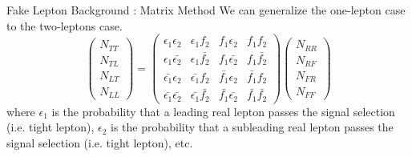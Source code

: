 \documentclass[mathserif,serif]{beamer}
\begin{document}
\begin{frame}{Fake Lepton Background : Matrix Method}
We can generalize the one-lepton case to the two-leptons case.
\begin{equation*}
\left( \begin{array}{c}
N_{TT} \\
N_{TL} \\
N_{LT} \\
N_{LL}
\end{array} \right)
=
\left( \begin{array}{cccc}
\epsilon_1 \epsilon_2 & \epsilon_1 f_2 & f_1 \epsilon_2 & f_1 f_2 \\
\epsilon_1 \bar{\epsilon_2} & \epsilon_1 \bar{f_2} & f_1 \bar{\epsilon_2} & f_1 \bar{f_2} \\
\bar{\epsilon_1} \epsilon_2 & \bar{\epsilon_1} f_2 & \bar{f_1} \epsilon_2 & \bar{f_1} f_2 \\
\bar{\epsilon_1} \bar{\epsilon_2} & \bar{\epsilon_1} \bar{f_2} & \bar{f_1} \bar{\epsilon_2} & \bar{f_1} \bar{f_2}
\end{array} \right)
\left( \begin{array}{c}
N_{RR} \\
N_{RF} \\
N_{FR} \\
N_{FF}
\end{array} \right)
\end{equation*}
where $\epsilon_1$ is the probability that a leading real lepton passes the signal selection (i.e. tight lepton), $\epsilon_2$ is the probability that a subleading real lepton passes the signal selection (i.e. tight lepton), etc.
\end{frame}
\end{document}
